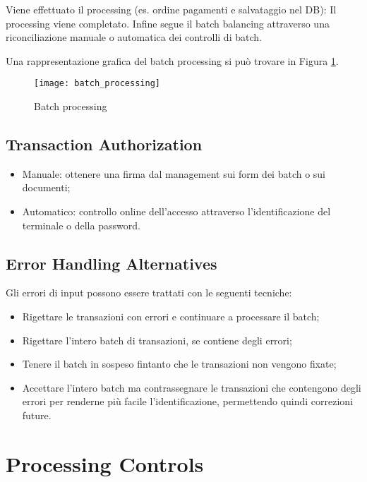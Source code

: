 Viene effettuato il processing (es. ordine pagamenti e salvataggio nel DB):
Il processing viene completato.
Infine segue il batch balancing attraverso
una riconciliazione manuale o automatica dei controlli di batch.

Una rappresentazione grafica del batch processing si può trovare in
Figura \ref{fig:security:batch:processing}.
\begin{figure}[h!]
        \begin{center}
                \texttt{[image: batch\_processing]}
        \end{center}
        \caption{Batch processing}
        \label{fig:security:batch:processing}
\end{figure}

\subsection{Transaction Authorization}
\begin{itemize}
    \item Manuale: ottenere una firma dal management sui form dei batch o sui
    documenti;
    \item Automatico: controllo online dell'accesso attraverso
    l'identificazione del terminale o della password.
\end{itemize}

\subsection{Error Handling Alternatives}
Gli errori di input possono essere trattati
con le seguenti tecniche:
\begin{itemize}
\item Rigettare le transazioni con errori e continuare a processare
il batch;
\item Rigettare l'intero batch di transazioni, se contiene
degli errori;
\item Tenere il batch in sospeso fintanto che le transazioni
non vengono fixate;
\item Accettare l'intero batch ma contrassegnare le transazioni che
contengono degli errori per renderne più facile l'identificazione,
permettendo quindi correzioni future.
\end{itemize}






\section{Processing Controls}

